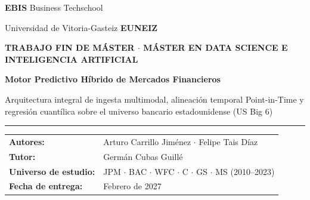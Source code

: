 \documentclass[11pt, a4paper]{report}
\begin{document}
\begin{titlepage}
    \thispagestyle{empty}
    \noindent
    \begin{minipage}[t]{0.5\textwidth}
        \raggedright
        {\fontsize{13}{15}\selectfont\bfseries\color{NavyPrimary} EBIS} {\fontsize{10}{12}\selectfont\color{MutedGray} Business Techschool}
    \end{minipage}%
    \begin{minipage}[t]{0.5\textwidth}
        \raggedleft
        {\fontsize{9}{11}\selectfont\color{MutedGray} Universidad de Vitoria-Gasteiz} {\fontsize{13}{15}\selectfont\bfseries\color{NavyPrimary} EUNEIZ}
    \end{minipage}

    \vspace{2.8cm}

    {\fontsize{9.5}{12}\selectfont\bfseries\color{CyanAccent}
    TRABAJO FIN DE MÁSTER \quad $\cdot$ \quad MÁSTER EN DATA SCIENCE E INTELIGENCIA ARTIFICIAL}

    \vspace{0.5cm}

    {\fontsize{26}{32}\selectfont\bfseries\color{NavyPrimary}
    Motor Predictivo Híbrido de Mercados Financieros\par}

    \vspace{0.4cm}

    {\fontsize{13}{18}\selectfont\color{MutedGray}
    Arquitectura integral de ingesta multimodal, alineación temporal Point-in-Time y regresión cuantílica sobre el universo bancario estadounidense (US Big 6)\par}

    \vspace{1.2cm}
    {\color{CyanAccent}\rule{3.5cm}{2pt}}
    \vspace{1.5cm}

    \begin{tabular}{!{\color{NavyPrimary}\vrule width 2.5pt}l l}
        \textbf{\color{NavyPrimary}Autores:} & Arturo Carrillo Jiménez $\cdot$ Felipe Tais Díaz \\[0.4em]
        \textbf{\color{NavyPrimary}Tutor:} & Germán Cubas Guillé \\[0.4em]
        \textbf{\color{NavyPrimary}Universo de estudio:} & JPM $\cdot$ BAC $\cdot$ WFC $\cdot$ C $\cdot$ GS $\cdot$ MS (2010--2023) \\[0.4em]
        \textbf{\color{NavyPrimary}Fecha de entrega:} & Febrero de 2027 \\
    \end{tabular}


\end{titlepage}
\end{document}
